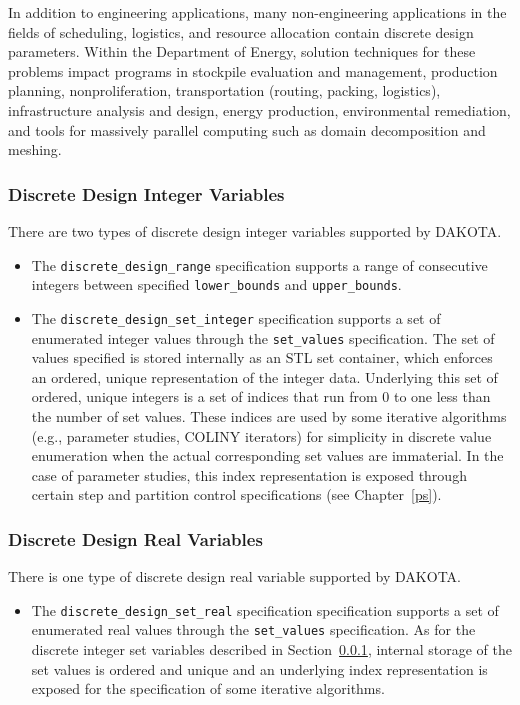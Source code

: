 In addition to engineering applications, many non-engineering
applications in the fields of scheduling, logistics, and resource
allocation contain discrete design parameters. Within the Department
of Energy, solution techniques for these problems impact programs in
stockpile evaluation and management, production planning,
nonproliferation, transportation (routing, packing, logistics),
infrastructure analysis and design, energy production, environmental
remediation, and tools for massively parallel computing such as domain
decomposition and meshing.

\subsubsection{Discrete Design Integer Variables}\label{variables:design:ddiv}

There are two types of discrete design integer variables supported by
DAKOTA.
\begin{itemize}

\item  The \texttt{discrete\_design\_range} specification supports a
range of consecutive integers between specified \texttt{lower\_bounds}
and \texttt{upper\_bounds}.

\item The \texttt{discrete\_design\_set\_integer} specification supports 
a set of enumerated integer values through the \texttt{set\_values} 
specification.  The set of values specified is stored internally as an 
STL set container, which enforces an ordered, unique representation of 
the integer data.  Underlying this set of ordered, unique integers is a 
set of indices that run from 0 to one less than the number of set values.
These indices are used by some iterative algorithms (e.g., parameter 
studies, COLINY iterators) for simplicity in discrete value enumeration 
when the actual corresponding set values are immaterial.  In the case of 
parameter studies, this index representation is exposed through certain 
step and partition control specifications (see Chapter~\ref{ps}).

\end{itemize}

\subsubsection{Discrete Design Real Variables}\label{variables:design:ddrv}

There is one type of discrete design real variable supported by
DAKOTA.
\begin{itemize}

\item The \texttt{discrete\_design\_set\_real} specification
specification supports a set of enumerated real values through the
\texttt{set\_values} specification.  As for the discrete integer
set variables described in Section~\ref{variables:design:ddiv},
internal storage of the set values is ordered and unique and an
underlying index representation is exposed for the specification of
some iterative algorithms.

\end{itemize}


